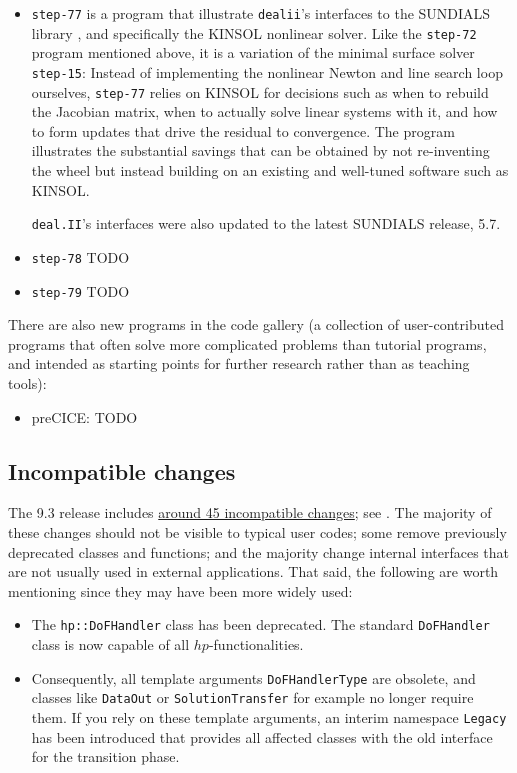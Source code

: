\documentclass{ansarticle-preprint}
\newcommand{\specialword}[1]{\texttt{#1}}
\newcommand{\dealii}{{\specialword{deal.II}}\xspace}
\begin{document}
\begin{itemize}
\item \texttt{step-77} is a program that illustrate \texttt{dealii}'s
  interfaces to the SUNDIALS library \cite{sundials}, and specifically
  the KINSOL nonlinear solver. Like the \texttt{step-72} program
  mentioned above, it is a variation of the minimal surface solver
  \texttt{step-15}: Instead of implementing the nonlinear Newton and
  line search loop ourselves, \texttt{step-77} relies on KINSOL for
  decisions such as when to rebuild the Jacobian matrix, when to
  actually solve linear systems with it, and how to form updates that
  drive the residual to convergence. The program illustrates the
  substantial savings that can be obtained by not re-inventing the
  wheel but instead building on an existing and well-tuned software
  such as KINSOL.

  \dealii{}'s interfaces were also updated to the latest SUNDIALS release, 5.7.

\item \texttt{step-78} TODO

\item \texttt{step-79} TODO
\end{itemize}

There are also new programs in the code gallery (a collection of
user-contributed programs that often solve more complicated problems
than tutorial programs, and intended as starting points for further
research rather than as teaching tools):
\begin{itemize}
  \item preCICE: TODO
\end{itemize}



\subsection{Incompatible changes}

The 9.3 release includes
\href{https://dealii.org/developer/doxygen/deal.II/changes_between_9_2_0_and_9_3_0.html}
{around 45 incompatible changes}; see \cite{changes93}. The majority of these changes
should not be visible to typical user codes; some remove previously
deprecated classes and functions; and the majority change internal
interfaces that are not usually used in external
applications. That said, the following are worth mentioning since they
may have been more widely used:
\begin{itemize}
  \item The \texttt{hp::DoFHandler} class has been deprecated. The standard
        \texttt{DoFHandler} class is now capable of all $hp$-functionalities.
  \item Consequently, all template arguments \texttt{DoFHandlerType} are obsolete,
        and classes like \texttt{DataOut} or \texttt{SolutionTransfer} for example
        no longer require them. If you rely on these template arguments, an interim
        namespace \texttt{Legacy} has been introduced that provides all affected
        classes with the old interface for the transition phase.
\end{itemize}
\end{document}
